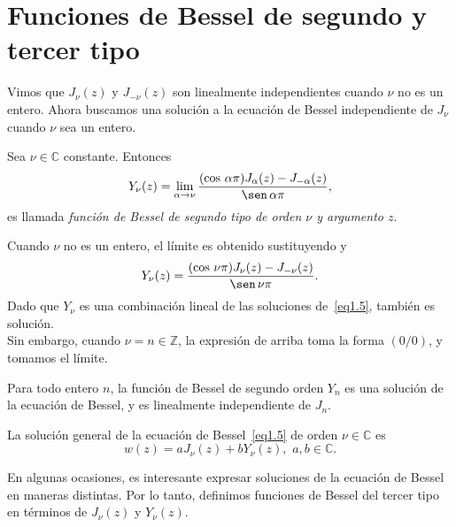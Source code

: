 \documentclass[main.tex]{subfiles}
\begin{document}
\section{Funciones de Bessel de segundo y tercer tipo}
\noindent Vimos que $J_{\nu}(z)$ y $J_{-\nu}(z)$ son linealmente independientes cuando $\nu$ no es un entero. Ahora buscamos una solución a la ecuación de Bessel independiente de $J_{\nu}$ cuando $\nu$ sea un entero.
\begin{def.}\label{d1.5} %
  Sea $\nu\in\mathbb{C}$ constante. Entonces
  \begin{equation}
    \label{eq1.8}
    Y_{\nu}(z)=\lim_{\alpha\to\nu}\frac{(\cos\,\alpha\pi)J_{\alpha}(z)-J_{-\alpha}(z)}{\sen\,\alpha\pi},
  \end{equation}
  es llamada \textit{función de Bessel de segundo tipo de orden $\nu$ y argumento $z$}.
\end{def.}
\obs%
  Cuando $\nu$ no es un entero, el límite es obtenido sustituyendo y
  \[
    Y_{\nu}(z)=\frac{(\cos\,\nu\pi)J_{\nu}(z)-J_{-\nu}(z)}{\sen\,\nu\pi}.
  \]
  Dado que $Y_{\nu}$ es una combinación lineal de las soluciones de~\eqref{eq1.5}, también es solución.\\
 Sin embargo, cuando $\nu=n\in\mathbb{Z}$, la expresión de arriba toma la forma $(0/0)$, y tomamos el límite.
\begin{prop}\label{p1.6)} %
  Para todo entero $n$, la función de Bessel de segundo orden $Y_{n}$ es una solución de la ecuación de Bessel, y es linealmente independiente de $J_{n}$.
\end{prop}
\begin{cor}\label{c1.1} %
  La solución general de la ecuación de Bessel~\eqref{eq1.5} de orden $\nu\in\mathbb{C}$ es
  \[
    w(z)=aJ_{\nu}(z)+bY_{\nu}(z),\,\,a,b\in\mathbb{C}.
  \]
\end{cor}
En algunas ocasiones, es interesante expresar soluciones de la ecuación de Bessel en maneras distintas. Por lo tanto, definimos funciones de Bessel del tercer tipo en términos de $J_{\nu}(z)$ y $Y_{\nu}(z)$.
\end{document}
